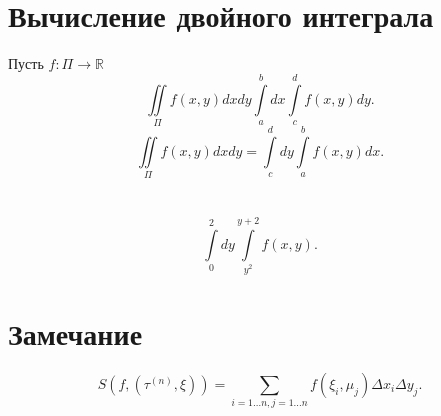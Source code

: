 \documentclass[14pt]{extarticle} \usepackage{fontspec}
\begin{document}
    \section{Вычисление двойного интеграла}
    Пусть $f: \Pi \to \mathbb{R}$
    \[
    \iint\limits_{\Pi} f(x,y) dx dy \int\limits_{a}^{b} dx \int\limits_{c}^{d} f(x,y)  dy
    .\] 
    \[
    \iint\limits_{\Pi} f(x,y) dx dy = \int\limits_{c}^{d} dy \int\limits_{a}^{b} f(x,y)   dx
    .\] 
    \section{}
    \[
        \int\limits_{0}^{2} dy \int\limits_{y^2}^{y+2} f(x,y)   
    .\] 
\section{Замечание}
\[
S(f,(\tau^{(n)},\xi)) = \sum_{i=1\dots n,j= 1 \dots n} f(\xi_{i},\mu_{j}) \varDelta x_{i} \varDelta y_{j}
.\] 
\end{document}
